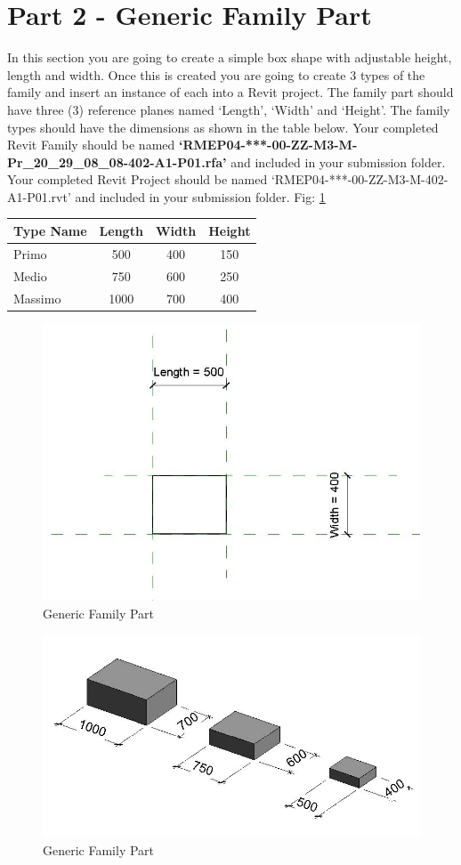 \newpage


\section*{Part 2 - Generic Family Part}
In this section you are going to create a simple box shape with adjustable height, length and width. Once this is created you are going to create 3 types of the family and insert an instance of each into a Revit project. The family part should have three (3) reference planes named ‘Length’, ‘Width’ and ‘Height’. The family types should have the dimensions as shown in the table below.  Your completed Revit Family should be named \textbf{‘RMEP04-***-00-ZZ-M3-M-Pr\_20\_29\_08\_08-402-A1-P01.rfa’} and included in your submission folder.  Your completed Revit Project should be named ‘RMEP04-***-00-ZZ-M3-M-402-A1-P01.rvt’ and included in your submission folder. Fig: \ref{fig:GenericFamilyPart1}\\


\begin{tabularx}{\textwidth}{ |X|c|c|c| }
	\hline
	\textbf{Type Name} & Length & Width & Height \\
	\hline 
	Primo & 500 & 400 & 150\\
	Medio & 750 & 600 & 250\\
	Massimo & 1000 & 700 & 400\\
	\hline
\end{tabularx}


\begin{figure}[h]
	\centering
	\includegraphics[width=0.7\linewidth]{./SP/img/ParaBox1.jpg}
	\caption{Generic Family Part}
	\label{fig:GenericFamilyPart1}
\end{figure}


\begin{figure}[h]
	\centering
	\includegraphics[width=0.7\linewidth]{./SP/img/ParaBox2.jpg}
	\caption{Generic Family Part}
	\label{fig:GenericFamilyPart2}
\end{figure}


